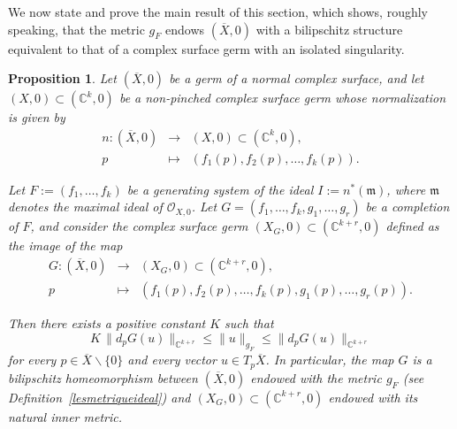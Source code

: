 \documentclass[reqno,dvipsnames,12pt]{amsart}
\renewcommand{\setminus}{\smallsetminus}
\newtheorem{prop}[thm]{Proposition}
\begin{document}
We now state and prove the main result of this section, which shows, roughly speaking, that the metric \(g_F\) endows \((\overline{X},0)\) with a bilipschitz structure equivalent to that of a complex surface germ with an isolated singularity.



\begin{prop}\label{onveutid}
Let $(\overline{X},0)$ be a germ of a normal complex surface, and let
$(X,0)\subset (\mathbb{C}^k,0)$ be a non-pinched complex surface germ whose normalization is given by
\[
\begin{array}{ccc}
n:(\overline{X},0) & \longrightarrow & (X,0)\subset (\mathbb{C}^k,0),\\
p & \longmapsto & (f_1(p),f_2(p),\dots,f_k(p)).
\end{array}
\]

Let $F:=(f_1,\dots,f_k)$ be a generating system of the ideal
$I:=n^*(\mathfrak m)$, where $\mathfrak m$ denotes the maximal ideal of
$\mathcal O_{X,0}$. Let
$G=(f_1,\dots,f_k,g_1,\dots,g_r)$ be a completion of $F$, and consider the complex surface germ
$(X_G,0)\subset (\mathbb C^{k+r},0)$ defined as the image of the map
\[
\begin{array}{ccc}
G:(\overline{X},0) & \longrightarrow & (X_G,0)\subset (\mathbb C^{k+r},0),\\
p & \longmapsto &
(f_1(p),f_2(p),\dots,f_k(p),g_1(p),\dots,g_r(p)).
\end{array}
\]

Then there exists a positive constant $K$ such that
\[
K\,\bigl\|d_pG(u)\bigl\|_{\mathbb C^{k+r}}
\leq
\bigl\| u\bigl\|_{g_F} 
\leq
\bigl\|d_pG(u)\bigl\|_{\mathbb C^{k+r}}
\]
for every $p\in \overline{X}\setminus\{0\}$ and every vector
$u\in T_p\overline{X}$. In particular, the map $G$ is a bilipschitz homeomorphism between
$(\overline{X},0)$ endowed with the metric $g_F$ (see Definition~\ref{lesmetriqueideal}) and $(X_G,0)\subset (\mathbb C^{k+r},0)$ endowed with its natural inner metric.
\end{prop}
\end{document}
